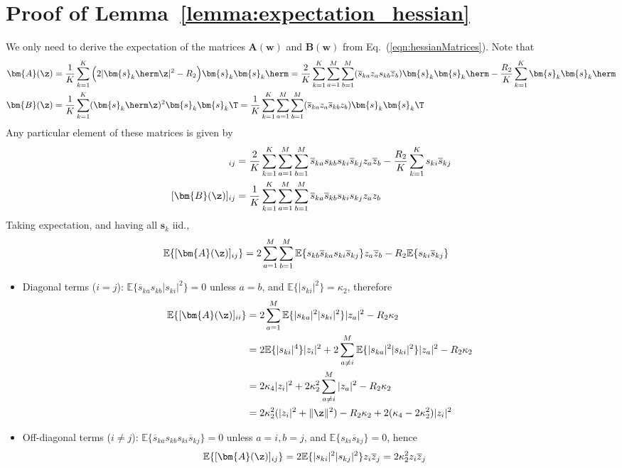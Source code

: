\section{Proof of Lemma~\ref{lemma:expectation_hessian}}\label{appdx:expectations_hessian}
We only need to derive the expectation of the matrices $\bm{A}(\bm{w})$ and $\bm{B}(\bm{w})$ from Eq.~(\ref{eqn:hessianMatrices}). Note that
\begin{align}
\bm{A}(\z)&=\frac{1}{K}\sum_{k=1}^K\Big(2|\bm{s}_k\herm\z|^2-R_2\Big)\bm{s}_k\bm{s}_k\herm
=\frac{2}{K}\sum_{k=1}^K\sum_{a=1}^M\sum_{b=1}^M(\overline{s}_{ka}z_as_{kb}\overline{z}_b)\bm{s}_k\bm{s}_k\herm-\frac{R_2}{K}\sum_{k=1}^K\bm{s}_k\bm{s}_k\herm\nonumber\\
\bm{B}(\z)&=\frac{1}{K}\sum_{k=1}^K(\bm{s}_k\herm\z)^2\bm{s}_k\bm{s}_k\T=\frac{1}{K}\sum_{k=1}^K\sum_{a=1}^M\sum_{b=1}^M(\overline{s}_{ka}z_a\overline{s}_{kb}{z}_b)\bm{s}_k\bm{s}_k\T\nonumber
\end{align}
Any particular element of these matrices is given by
\begin{align}
[\bm{A}(\z)]_{ij}&=\frac{2}{K}\sum_{k=1}^K\sum_{a=1}^M\sum_{b=1}^M\overline{s}_{ka}{s}_{kb}s_{ki}\overline{s}_{kj}z_a\overline{z}_b-\frac{R_2}{K}\sum_{k=1}^Ks_{ki}\overline{s}_{kj}\\
[\bm{B}(\z)]_{ij}&=\frac{1}{K}\sum_{k=1}^K\sum_{a=1}^M\sum_{b=1}^M\overline{s}_{ka}\overline{s}_{kb}s_{ki}{s}_{kj}z_a{z}_b
\end{align}
Taking expectation, and having all $\bm{s}_k$ iid.,
\begin{align}
\mathbb{E}\{[\bm{A}(\z)]_{ij}\}&=2\sum_{a=1}^M\sum_{b=1}^M\mathbb{E}\{s_{kb}\overline{s}_{ka}s_{ki}\overline{s}_{kj}\}z_a\overline{z}_b-R_2\mathbb{E}\{s_{ki}\overline{s}_{kj}\}
\end{align}
\begin{itemize}
	\item Diagonal terms ($i=j$): $\mathbb{E}\{\overline{s}_{ka}s_{kb}|s_{ki}|^2\}= 0$ unless $a=b$, and $\mathbb{E}\{|s_{ki}|^2\}=\kappa_2$, therefore
	\begin{align}
	\mathbb{E}\{[\bm{A}(\z)]_{ii}\}
	&=2\sum_{a=1}^M\mathbb{E}\{|s_{ka}|^2|s_{ki}|^2\}|z_a|^2-R_2\kappa_2\nonumber\\
	&=2\mathbb{E}\{|s_{ki}|^4\}|z_i|^2+2\sum_{a\neq i}^M\mathbb{E}\{|s_{ka}|^2|s_{ki}|^2\}|z_a|^2-R_2\kappa_2\nonumber\\
	&=2\kappa_4|z_i|^2+2\kappa_2^2\sum_{a\neq i}^M|z_a|^2-R_2\kappa_2\nonumber\\
	&=2\kappa_2^2(|z_i|^2+\|\z\|^2)-R_2\kappa_2+2(\kappa_4-2\kappa_2^2)|z_i|^2
	\end{align}
	\item Off-diagonal terms ($i\neq j$): $\mathbb{E}\{\overline{s}_{ka}{s}_{kb}s_{ki}\overline{s}_{kj}\}=0$ unless $a=i,b=j$, and $\mathbb{E}\{s_{ki}\overline{s}_{kj}\}=0$, hence
	\begin{align}
	\mathbb{E}\{[\bm{A}(\z)]_{ij}\}&=2\mathbb{E}\{|s_{ki}|^2|s_{kj}|^2\}z_i\overline{z}_j=2\kappa_2^2z_i\overline{z}_j
	\end{align}
\end{itemize}
